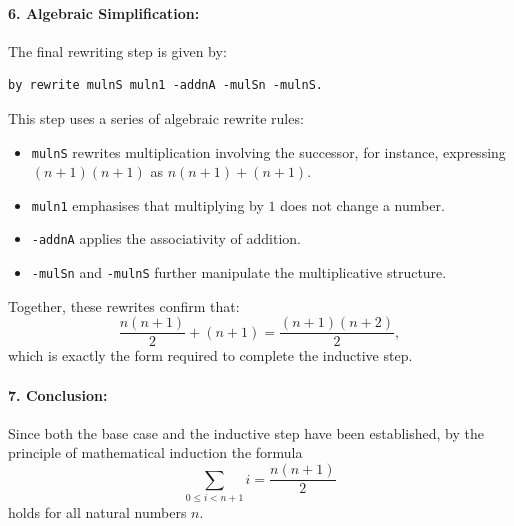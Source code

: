 \documentclass[10pt,nonacm,natbib=false]{acmart}
\begin{document}
\paragraph{6. Algebraic Simplification:}
The final rewriting step is given by:
\begin{verbatim}
by rewrite mulnS muln1 -addnA -mulSn -mulnS.
\end{verbatim}
This step uses a series of algebraic rewrite rules:
\begin{itemize}
    \item \texttt{mulnS} rewrites multiplication involving the successor, for instance, expressing \((n+1)(n+1)\) as \( n(n+1) + (n+1) \).
    \item \texttt{muln1} emphasises that multiplying by \( 1 \) does not change a number.
    \item \texttt{-addnA} applies the associativity of addition.
    \item \texttt{-mulSn} and \texttt{-mulnS} further manipulate the multiplicative structure.
\end{itemize}
Together, these rewrites confirm that:
\[
\frac{n(n+1)}{2} + (n+1) = \frac{(n+1)(n+2)}{2},
\]
which is exactly the form required to complete the inductive step.

\paragraph{7. Conclusion:}
Since both the base case and the inductive step have been established, by the principle of mathematical induction the formula
\[
\sum_{0 \le i < n+1} i = \frac{n(n+1)}{2}
\]
holds for all natural numbers \( n \).


\newpage


\end{document}
